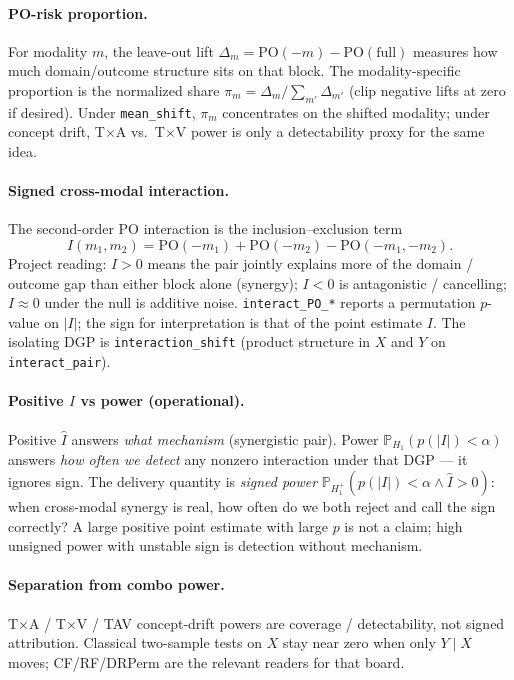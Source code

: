 \paragraph{PO-risk proportion.}
For modality $m$, the leave-out lift
$\Delta_m=\mathrm{PO}(-m)-\mathrm{PO}(\mathrm{full})$
measures how much domain/outcome structure sits on that block.
The modality-specific proportion is the normalized share
$\pi_m=\Delta_m/\sum_{m'}\Delta_{m'}$
(clip negative lifts at zero if desired).
Under \texttt{mean\_shift}, $\pi_m$ concentrates on the shifted modality;
under concept drift, T$\times$A vs.\ T$\times$V power is only a detectability proxy for the same idea.

\paragraph{Signed cross-modal interaction.}
The second-order PO interaction is the inclusion--exclusion term
\[
I(m_1,m_2)=\mathrm{PO}(-m_1)+\mathrm{PO}(-m_2)-\mathrm{PO}(-m_1,-m_2).
\]
Project reading: $I>0$ means the pair jointly explains more of the domain /
outcome gap than either block alone (synergy); $I<0$ is antagonistic /
cancelling; $I\approx 0$ under the null is additive noise.
\texttt{interact\_PO\_*} reports a permutation $p$-value on $|I|$;
the sign for interpretation is that of the point estimate $I$.
The isolating DGP is \texttt{interaction\_shift} (product structure in $X$ and $Y$
on \texttt{interact\_pair}).

\paragraph{Positive $I$ vs power (operational).}
Positive $\hat I$ answers \emph{what mechanism} (synergistic pair).
Power $\mathbb{P}_{H_1}(p(|I|)<\alpha)$ answers \emph{how often we detect}
any nonzero interaction under that DGP --- it ignores sign.
The delivery quantity is
\emph{signed power}
$\mathbb{P}_{H_1^{+}}(p(|I|)<\alpha \wedge \hat I>0)$:
when cross-modal synergy is real, how often do we both reject and call the
sign correctly? A large positive point estimate with large $p$ is not a claim;
high unsigned power with unstable sign is detection without mechanism.

\paragraph{Separation from combo power.}
T$\times$A / T$\times$V / TAV concept-drift powers are coverage / detectability,
not signed attribution. Classical two-sample tests on $X$ stay near zero when
only $Y\mid X$ moves; CF/RF/DRPerm are the relevant readers for that board.
